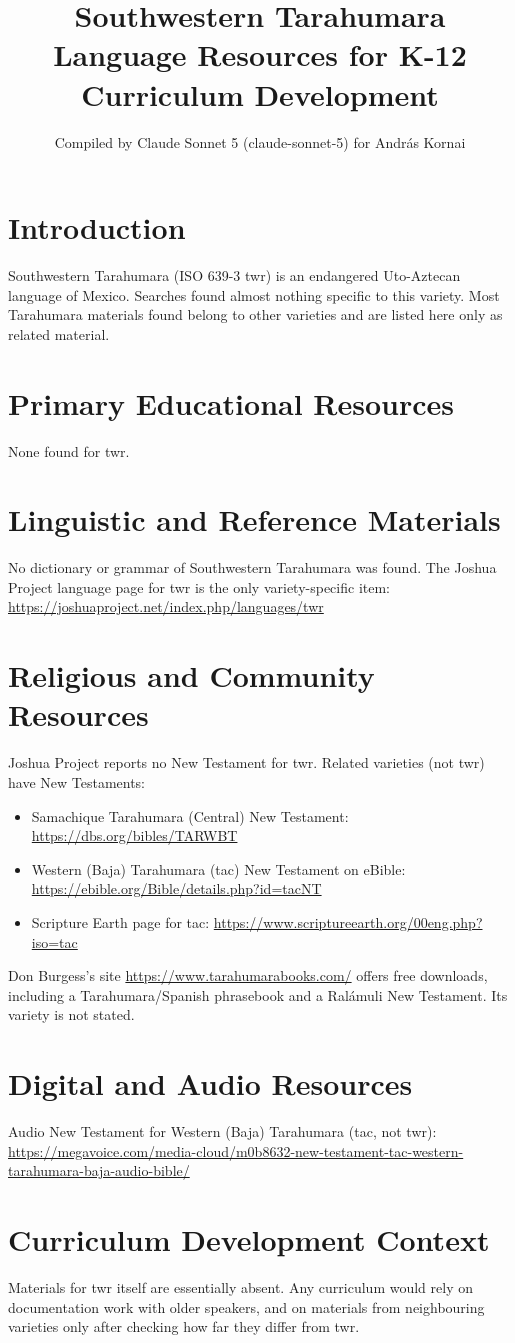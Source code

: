 \documentclass[12pt]{article}
\title{Southwestern Tarahumara Language Resources for K-12 Curriculum Development}
\author{Compiled by Claude Sonnet 5 (claude-sonnet-5) for Andr\'as Kornai}
\date{}
\begin{document}
\maketitle
\section{Introduction}
Southwestern Tarahumara (ISO 639-3 twr) is an endangered Uto-Aztecan language of Mexico. Searches found almost nothing specific to this variety. Most Tarahumara materials found belong to other varieties and are listed here only as related material.
\section{Primary Educational Resources}
None found for twr.
\section{Linguistic and Reference Materials}
No dictionary or grammar of Southwestern Tarahumara was found. The Joshua Project language page for twr is the only variety-specific item: \url{https://joshuaproject.net/index.php/languages/twr}
\section{Religious and Community Resources}
Joshua Project reports no New Testament for twr. Related varieties (not twr) have New Testaments:
\begin{itemize}
\item Samachique Tarahumara (Central) New Testament: \url{https://dbs.org/bibles/TARWBT}
\item Western (Baja) Tarahumara (tac) New Testament on eBible: \url{https://ebible.org/Bible/details.php?id=tacNT}
\item Scripture Earth page for tac: \url{https://www.scriptureearth.org/00eng.php?iso=tac}
\end{itemize}
Don Burgess's site \url{https://www.tarahumarabooks.com/} offers free downloads, including a Tarahumara/Spanish phrasebook and a Ral\'amuli New Testament. Its variety is not stated.
\section{Digital and Audio Resources}
Audio New Testament for Western (Baja) Tarahumara (tac, not twr): \url{https://megavoice.com/media-cloud/m0b8632-new-testament-tac-western-tarahumara-baja-audio-bible/}
\section{Curriculum Development Context}
Materials for twr itself are essentially absent. Any curriculum would rely on documentation work with older speakers, and on materials from neighbouring varieties only after checking how far they differ from twr.
\end{document}
